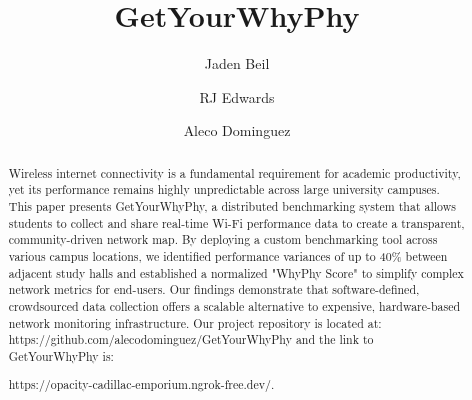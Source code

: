 \documentclass[sigconf]{acmart}
\begin{document}
\title{GetYourWhyPhy}


\author{Jaden Beil}

\author{RJ Edwards}

\author{Aleco Dominguez}

\begin{abstract}
  Wireless internet connectivity is a fundamental requirement for academic productivity, yet its performance remains highly unpredictable across large university campuses. This paper presents GetYourWhyPhy, a distributed benchmarking system that allows students to collect and share real-time Wi-Fi performance data to create a transparent, community-driven network map. By deploying a custom benchmarking tool across various campus locations, we identified performance variances of up to 40\% between adjacent study halls and established a normalized "WhyPhy Score" to simplify complex network metrics for end-users. Our findings demonstrate that software-defined, crowdsourced data collection offers a scalable alternative to expensive, hardware-based network monitoring infrastructure. Our project repository is located at: https://github.com/alecodominguez/GetYourWhyPhy and the link to GetYourWhyPhy is:
  
  https://opacity-cadillac-emporium.ngrok-free.dev/.

\end{abstract}

  
\end{document}
